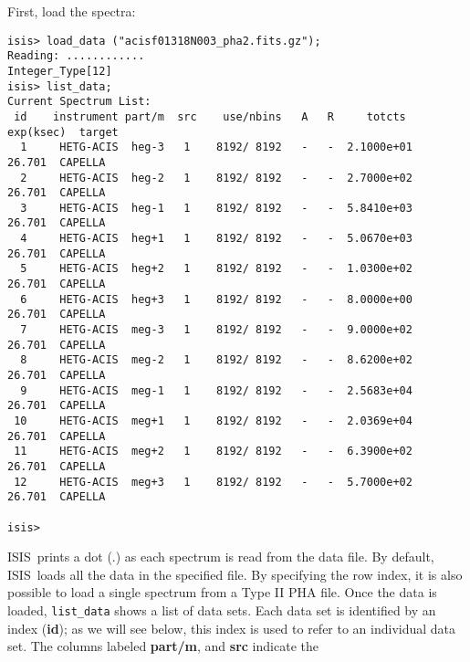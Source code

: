 \documentclass{book}
\newcommand{\isisx}{{\sc ISIS~}}
\begin{document}
First, load the spectra:
\begin{verbatim}
isis> load_data ("acisf01318N003_pha2.fits.gz");
Reading: ............
Integer_Type[12]
isis> list_data;
Current Spectrum List:
 id    instrument part/m  src    use/nbins   A   R     totcts   exp(ksec)  target
  1     HETG-ACIS  heg-3   1    8192/ 8192   -   -  2.1000e+01    26.701  CAPELLA
  2     HETG-ACIS  heg-2   1    8192/ 8192   -   -  2.7000e+02    26.701  CAPELLA
  3     HETG-ACIS  heg-1   1    8192/ 8192   -   -  5.8410e+03    26.701  CAPELLA
  4     HETG-ACIS  heg+1   1    8192/ 8192   -   -  5.0670e+03    26.701  CAPELLA
  5     HETG-ACIS  heg+2   1    8192/ 8192   -   -  1.0300e+02    26.701  CAPELLA
  6     HETG-ACIS  heg+3   1    8192/ 8192   -   -  8.0000e+00    26.701  CAPELLA
  7     HETG-ACIS  meg-3   1    8192/ 8192   -   -  9.0000e+02    26.701  CAPELLA
  8     HETG-ACIS  meg-2   1    8192/ 8192   -   -  8.6200e+02    26.701  CAPELLA
  9     HETG-ACIS  meg-1   1    8192/ 8192   -   -  2.5683e+04    26.701  CAPELLA
 10     HETG-ACIS  meg+1   1    8192/ 8192   -   -  2.0369e+04    26.701  CAPELLA
 11     HETG-ACIS  meg+2   1    8192/ 8192   -   -  6.3900e+02    26.701  CAPELLA
 12     HETG-ACIS  meg+3   1    8192/ 8192   -   -  5.7000e+02    26.701  CAPELLA

isis>
\end{verbatim}
\isisx prints a dot (.) as each spectrum is read from the data
file.  By default, \isisx loads all the data in the specified
file.  By specifying the row index, it is also possible to load
a single spectrum from a Type II PHA file.  Once the data is
loaded, \verb|list_data| shows a list of data sets.  Each data
set is identified by an index ({\bf id}); as we will see below,
this index is used to refer to an individual data set.  The
columns labeled {\bf part/m}, and {\bf src} indicate the
\end{document}
